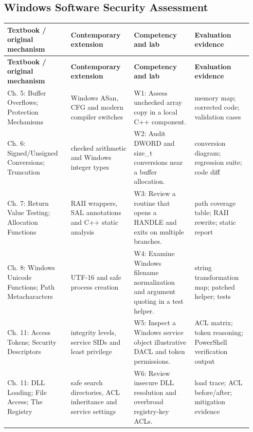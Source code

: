 \documentclass[10pt,letterpaper]{article}
\begin{document}
\subsection{Windows Software Security Assessment}
\begingroup\footnotesize\setlength\tabcolsep{3pt}
\begin{longtable}{>{\raggedright\arraybackslash}p{}>{\raggedright\arraybackslash}p{}>{\raggedright\arraybackslash}p{}>{\raggedright\arraybackslash}p{}}\toprule
\textbf{Textbook / original mechanism} & \textbf{Contemporary extension} & \textbf{Competency and lab} & \textbf{Evaluation evidence}\\\midrule\endfirsthead
\toprule \textbf{Textbook / original mechanism} & \textbf{Contemporary extension} & \textbf{Competency and lab} & \textbf{Evaluation evidence}\\\midrule\endhead
Ch. 5: Buffer Overflows; Protection Mechanisms & Windows ASan, CFG and modern compiler switches & W1: Assess unchecked array copy in a local C++ component. & memory map; corrected code; validation cases\\\midrule
Ch. 6: Signed/Unsigned Conversions; Truncation & checked arithmetic and Windows integer types & W2: Audit DWORD and size\_t conversions near a buffer allocation. & conversion diagram; regression suite; code diff\\\midrule
Ch. 7: Return Value Testing; Allocation Functions & RAII wrappers, SAL annotations and C++ static analysis & W3: Review a routine that opens a HANDLE and exits on multiple branches. & path coverage table; RAII rewrite; static report\\\midrule
Ch. 8: Windows Unicode Functions; Path Metacharacters & UTF-16 and safe process creation & W4: Examine Windows filename normalization and argument quoting in a test helper. & string transformation map; patched helper; tests\\\midrule
Ch. 11: Access Tokens; Security Descriptors & integrity levels, service SIDs and least privilege & W5: Inspect a Windows service object illustrative DACL and token permissions. & ACL matrix; token reasoning; PowerShell verification output\\\midrule
Ch. 11: DLL Loading; File Access; The Registry & safe search directories, ACL inheritance and service settings & W6: Review insecure DLL resolution and overbroad registry-key ACLs. & load trace; ACL before/after; mitigation evidence\\\midrule

\end{longtable}
\end{document}
